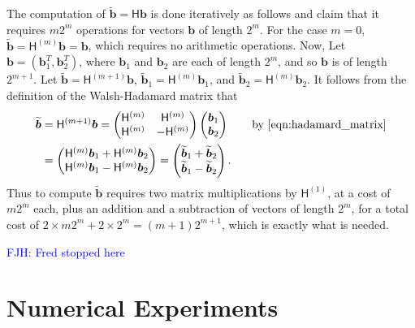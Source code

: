 \documentclass[graybox,footinfo]{svmult}
\newcommand{\bm}[1]{\boldsymbol{#1}}
\newcommand{\vb}{\bm{b}}
\newcommand{\tvb}{\widetilde{\vb}}
\newcommand{\mH}{\mathsf{H}}
\newcommand{\FJHNote}[1]{{\textcolor{blue}{FJH: #1}}}
\begin{document}
The computation of $\tvb =\mH \vb$ is done iteratively as follows and claim that it requires $m2^m$ operations for vectors $\vb$ of length $2^m$. For the case $m=0$, $\tvb = \mH^{(m)} \vb = \vb$, which requires no arithmetic operations.  Now, Let $\vb = (\vb_1^{T},  \vb_2^{T})$, where $\vb_1$ and $\vb_2$ are each of length $2^m$, and so $\vb$ is of length $2^{m+1}$.  Let $\tvb = \mH^{(m+1)} \vb$,  $\tvb_1 = \mH^{(m)} \vb_1$, and $\tvb_2 = \mH^{(m)} \vb_2$.  It follows from the definition of the Walsh-Hadamard matrix that 
\begin{align*}
\tvb &= \mH^{({m+1})} \vb = \begin{pmatrix}
\mH^{(m)} & \mH^{(m)} \\ \mH^{(m)} & - \mH^{(m)}
\end{pmatrix} 
\begin{pmatrix}
\vb_1 \\ \vb_2
\end{pmatrix} \qquad \text{by \eqref{eqn:hadamard_matrix}} \\
&= 
\begin{pmatrix}
\mH^{(m)} \vb_1 + \mH^{(m)}\vb_2 \\ 
\mH^{(m)} \vb_1 - \mH^{(m)} \vb_2
\end{pmatrix}
= 
\begin{pmatrix}
\tvb_1 + \tvb_2 \\ 
\tvb_1 - \tvb_2
\end{pmatrix}.
\end{align*}
Thus to compute $\tvb$ requires two matrix multiplications by $\mH^{(1)}$, at a cost of $m 2^m$ each, plus an addition and a subtraction of vectors of length $2^m$, for a total cost of $2 \times m 2^m + 2 \times 2^m = (m+1) 2^{m+1}$, which is exactly what is needed.


\FJHNote{Fred stopped here}




%



\section{Numerical Experiments}

\label{sec:NumExp}
\end{document}
